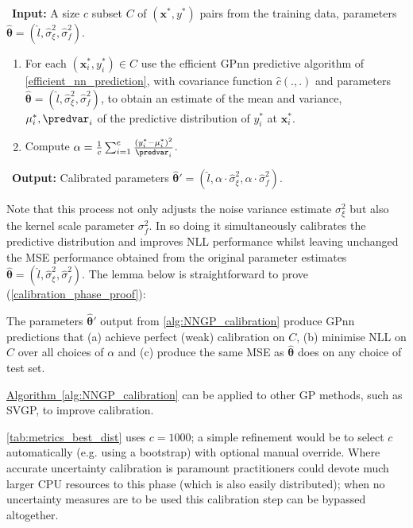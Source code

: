  \begin{algorithm}[h]
     \,\,\,\textbf{Input:} A size $c$ subset $C$ of $(\bm{x}^*,y^*)$ pairs from the training data, parameters $\hat{\bm{\theta}} = (\hat{l},\hat{\sigma}_\xi^2,\hat{\sigma}_f^2)$.
    \begin{enumerate}[itemsep=1pt]
      \item For each $(\bm{x}_i^*,y_i^*) \in C$ use the efficient GPnn predictive algorithm of \ref{efficient_nn_prediction}, with covariance function $\hat{c}(.,.)$ and parameters $\hat{\bm{\theta}} = (\hat{l},\hat{\sigma}_\xi^2,\hat{\sigma}_f^2)$, to obtain an estimate of the mean and variance, $\mu_i^*,\predvar_i$ of the predictive distribution of $y_i^*$ at $\bm{x}_i^*$.
      \item Compute $\alpha = \frac{1}{c}\sum_{i=1}^c \frac{(y_i^* - \mu_i^*)^2}{\predvar_i}$.
    \end{enumerate}    
    \,\,\,\textbf{Output:} Calibrated parameters $\hat{\bm{\theta}}' = (\hat{l},\alpha \cdot \hat{\sigma}_\xi^2, \alpha \cdot \hat{\sigma}_f^2)$.
     \caption{Calibration of Predictive Distribution}
     \label{alg:NNGP_calibration}
   \end{algorithm}
Note that this process not only adjusts the noise variance estimate $\sigma_\xi^2$ but also the kernel scale parameter $\sigma_f^2$. In so doing it simultaneously calibrates the predictive distribution and improves NLL performance whilst leaving unchanged the MSE performance obtained from the original parameter estimates $\hat{\bm{\theta}} = (\hat{l},\hat{\sigma}_\xi^2,\hat{\sigma}_f^2)$. The lemma below is straightforward to prove (\autoref{calibration_phase_proof}):
\begin{lemma}[Calibration]
\label{calibration_lemma}
The parameters $\hat{\bm{\theta}}'$ output from \autoref {alg:NNGP_calibration} produce GPnn predictions that (a) achieve perfect (weak) calibration on $C$, (b) minimise NLL on $C$ over all choices of $\alpha$ and (c) produce the same MSE as $\hat{\bm{\theta}}$ does on any choice of test set.
\end{lemma}
\begin{remark}
     \hyperref[alg:NNGP_calibration]{Algorithm~\ref*{alg:NNGP_calibration}} can be applied to other GP methods, such as SVGP, to improve calibration.
\end{remark}
\autoref{tab:metrics_best_dist} uses $c = 1000$; a simple refinement would be to select $c$ automatically (e.g. using a bootstrap) with optional manual override. Where accurate uncertainty calibration is paramount practitioners could devote much larger CPU resources to this phase (which is also easily distributed); when no uncertainty measures are to be used this calibration step can be bypassed altogether.


